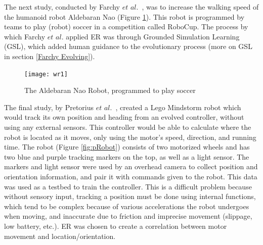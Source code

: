 \documentclass{sig-alternate}
\begin{document}
	
	The next study, conducted by Farchy $et$ $al.$~\cite{Farchy:2013:HRL:2484920.2484930}, was to increase the walking speed of the humanoid robot Aldebaran Nao (Figure \ref{fig:wRobot}). This robot is programmed by teams to play (robot) soccer in a competition called RoboCup. The process by which  Farchy $et$ $al.$ applied ER was through Grounded Simulation Learning (GSL), which added human guidance to the evolutionary process (more on GSL in section \ref{Farchy Evolving}). 
	
\begin{figure}%
\begin{center}
  \texttt{[image: wr1]}
\end{center}
\caption{The Aldebaran Nao Robot, programmed to play soccer}
\label{fig:wRobot}
\end{figure}

	The final study, by Pretorius $et$ $al.$~\cite{Pretorius:2009:TAN:1632149.1632171}, created a Lego Mindstorm robot which would track its own position and heading from an evolved controller, without using any external sensors. This controller would be able to calculate where the robot is located as it moves, only using the motor's speed, direction, and running time. The robot (Figure \ref{fig:pRobot}) consists of two motorized wheels and has two blue and purple tracking markers on the top, as well as a light sensor. The markers and light sensor were used by an overhead camera to collect position and orientation information, and pair it with commands given to the robot. This data was used as a testbed to train the controller. This is a difficult problem because without sensory input, tracking a position must be done using internal functions, which tend to be complex because of various accelerations the robot undergoes when moving, and inaccurate due to friction and imprecise movement (slippage, low battery, etc.). ER was chosen to create a correlation between motor movement and location/orientation. 
\end{document}
